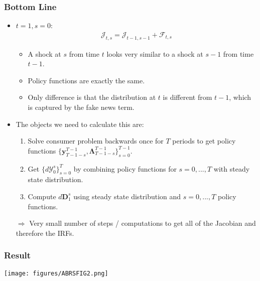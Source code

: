 \documentclass[english,xcolor=svgnames]{beamer}
\begin{document}
\begin{frame}
    \frametitle{Bottom Line}
    \begin{itemize}
        \item $t=1,s=0$:
        \begin{align*}
        	\mathcal{J}_{t,s} = \mathcal{J}_{t-1,s-1} + \mathcal{F}_{t,s} 
        \end{align*}
        \begin{itemize}
        	\item A shock at $s$ from time $t$ looks very similar to a shock at $s-1$ from time $t-1$. 
        	\item Policy functions are exactly the same.
        	\item Only difference is that the distribution at $t$ is different from $t-1$, which is captured by the fake news term. 
        \end{itemize}
       	\item The objects we need to calculate this are:
       	\begin{enumerate}
       		\item Solve consumer problem backwards once for $T$ periods to get policy functions $\{\bm{y}^{T-1}_{T-1-s},\bm{\Lambda}^{T-1}_{T-1-s}\}_{s=0}^{T-1}$.
       		\item Get $\{d\mathcal{Y}_0^s\}_{s=0}^T$ by combining policy functions for $s=0,...,T$ with steady state distribution.
       		\item Compute $d\bm{D}_1^s$ using steady state distribution and $s=0,...,T$ policy functions.
       	\end{enumerate}
       	\item[$\Rightarrow$] Very small number of steps / computations to get all of the Jacobian and therefore the IRFs.
	\end{itemize}
\end{frame}


\begin{frame}
    \frametitle{Result}
    \centering
    \texttt{[image: figures/ABRSFIG2.png]}
\end{frame}
\end{document}

